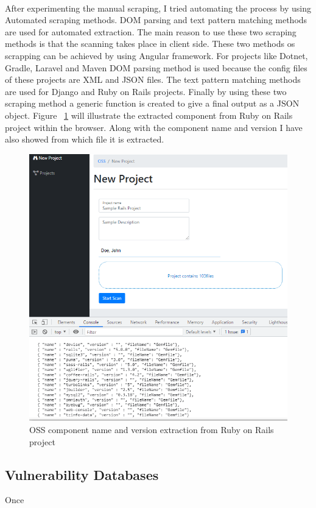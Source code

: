 \paragraph{}
After experimenting the manual scraping, I tried automating the process by using Automated scraping methods. DOM parsing and text pattern matching methods are used for automated extraction. The main reason to use these two scraping methods is that the scanning takes place in client side. These two methods os scrapping can be achieved by using Angular framework. For projects like Dotnet, Gradle, Laravel and Maven DOM parsing method is used because the config files of these projects are XML and JSON files. The text pattern matching methods are used for Django and Ruby on Rails projects. Finally by using these two scraping method a generic function is created to give a final output as a JSON object. Figure ~\ref{fig:clientOutput} will illustrate the extracted component from Ruby on Rails project within the browser. Along with the component name and version I have also showed from which file it is extracted. 
\newpage
\begin{figure}[H]
	\includegraphics[width=15cm]{includes/clientOutput.PNG}
	\centering
	\caption{OSS component name and version extraction from Ruby on Rails project}
	\label{fig:clientOutput}
\end{figure}

\subsection{Vulnerability Databases}
Once 
